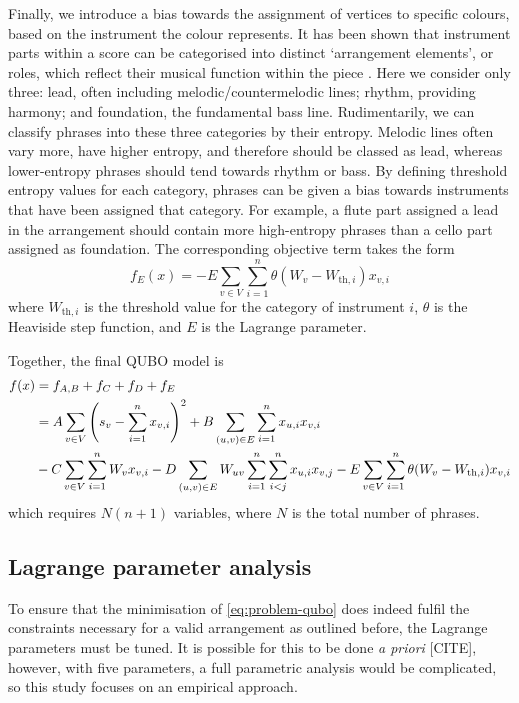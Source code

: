 \documentclass[12pt]{article}
\theoremstyle{definition}
\begin{document}
Finally, we introduce a bias towards the assignment of vertices to specific colours, based on the instrument the colour represents. It has been shown that instrument parts within a score can be categorised into distinct `arrangement elements', or roles, which reflect their musical function within the piece \cite{owsinski_mixing_2017}. Here we consider only three: lead, often including melodic/countermelodic lines; rhythm, providing harmony; and foundation, the fundamental bass line. Rudimentarily, we can classify phrases into these three categories by their entropy. Melodic lines often vary more, have higher entropy, and therefore should be classed as lead, whereas lower-entropy phrases should tend towards rhythm or bass. By defining threshold entropy values for each category, phrases can be given a bias towards instruments that have been assigned that category. For example, a flute part assigned a lead in the arrangement should contain more high-entropy phrases than a cello part assigned as foundation. The corresponding objective term takes the form
\begin{equation}
    f_E(x) = -E\sum_{v\in V}\sum_{i=1}^n \theta(W_v - W_{\text{th},i})x_{v,i}
\end{equation}
where $W_{\text{th},i}$ is the threshold value for the category of instrument $i$, $\theta$ is the Heaviside step function, and $E$ is the Lagrange parameter.

Together, the final QUBO model is
\begin{align}
    f(x)&=f_{A,B}+f_C+f_D+f_E \notag\\
    &=A\sum_{v \in V}\left(s_v-\sum_{i=1}^{n} x_{v,i}\right)^2+B\sum_{(u,v) \in E}\sum_{i=1}^n x_{u,i}x_{v,i} \notag\\
    &-C\sum_{v \in V}\sum_{i=1}^n W_vx_{v,i}-D\sum_{(u,v)\in E}W_{uv}\sum_{i=1}^n\sum_{i<j}^n x_{u,i}x_{v,j}-E\sum_{v \in V}\sum_{i=1}^n\theta(W_v-W_{\text{th},i})x_{v,i}
    \label{eq:problem-qubo}
\end{align}
which requires $N(n+1)$ variables, where $N$ is the total number of phrases.

\subsection{Lagrange parameter analysis}

To ensure that the minimisation of \cref{eq:problem-qubo} does indeed fulfil the constraints necessary for a valid arrangement as outlined before, the Lagrange parameters must be tuned. It is possible for this to be done \textit{a priori} [CITE], however, with five parameters, a full parametric analysis would be complicated, so this study focuses on an empirical approach.
\end{document}
